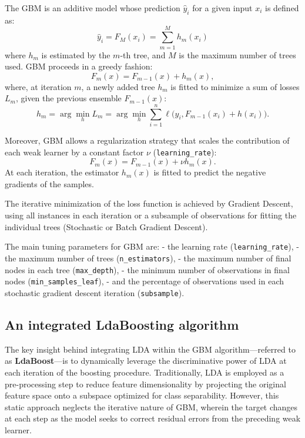 \documentclass[11pt,a4paper]{article}
\begin{document}
The GBM is an additive model whose prediction $\hat{y}_i$ for a given input $x_i$ is defined as:
\[
\hat{y}_i = F_M(x_i) = \sum_{m=1}^M h_m(x_i) \tag{1}
\]
where $h_m$ is estimated by the $m$-th tree, and $M$ is the maximum number of trees used.  
GBM proceeds in a greedy fashion:
\[
F_m(x) = F_{m-1}(x) + h_m(x),
\]
where, at iteration $m$, a newly added tree $h_m$ is fitted to minimize a sum of losses $L_m$, given the previous ensemble $F_{m-1}(x)$:
\[
h_m = \arg \min_h L_m = \arg \min_h \sum_{i=1}^n \ell \Big(y_i, F_{m-1}(x_i) + h(x_i)\Big). \tag{2}
\]

Moreover, GBM allows a regularization strategy that scales the contribution of each weak learner by a constant factor $\nu$ (\texttt{learning\_rate}):
\[
F_m(x) = F_{m-1}(x) + \nu h_m(x).
\]
At each iteration, the estimator $h_m(x)$ is fitted to predict the negative gradients of the samples.

The iterative minimization of the loss function is achieved by Gradient Descent, using all instances in each iteration or a subsample of observations for fitting the individual trees (Stochastic or Batch Gradient Descent).

The main tuning parameters for GBM are:  
- the learning rate (\texttt{learning\_rate}),  
- the maximum number of trees (\texttt{n\_estimators}),  
- the maximum number of final nodes in each tree (\texttt{max\_depth}),  
- the minimum number of observations in final nodes (\texttt{min\_samples\_leaf}),  
- and the percentage of observations used in each stochastic gradient descent iteration (\texttt{subsample}).


\subsection{An integrated LdaBoosting algorithm}
The key insight behind integrating LDA within the GBM algorithm—referred to as \textbf{LdaBoost}—is to dynamically leverage the discriminative power of LDA at each iteration of the boosting procedure.  
Traditionally, LDA is employed as a pre-processing step to reduce feature dimensionality by projecting the original feature space onto a subspace optimized for class separability.  
However, this static approach neglects the iterative nature of GBM, wherein the target changes at each step as the model seeks to correct residual errors from the preceding weak learner.
\end{document}
